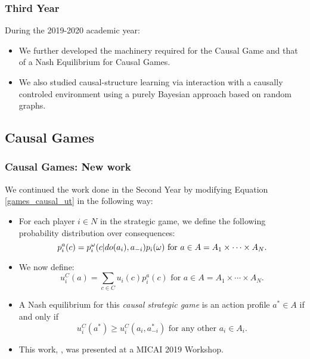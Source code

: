 \documentclass{beamer}
\theoremstyle{plain}
\begin{document}
\begin{frame}
\frametitle{Third Year}
During the 2019-2020 academic year:
\begin{itemize}
\item We further developed the machinery required for the Causal Game and that of a Nash Equilibrium for Causal Games.
\item We also studied causal-structure learning via interaction with a causally controled environment using a purely Bayesian approach based on random graphs.
\end{itemize}
\end{frame}

\subsection{Causal Games}
\begin{frame}
\frametitle{Causal Games: New work}
We continued the work done in the Second Year by modifying Equation \ref{games_causal_ut} in the following way:
\begin{itemize}
\item For each player $i \in N$ in the strategic game, we define the following probability distribution over consequences:
\begin{equation}{\label{causal_utility}}
p^a_i (c) =  p^\omega_i (c | do(a_i), a_{-i}) p_i(\omega)\textrm{ for } a \in A=A_1 \times \cdots \times A_N.
\end{equation}
\item We now define:
\begin{equation}
u^C_i (a) = \sum_{c \in C}  u_i(c) p^a_i (c) \textrm{ for } a \in A=A_1 \times \cdots \times A_N.
\end{equation}
\item A Nash equilibrium for this \textit{causal strategic game} is an action profile $a^\ast \in A$ if and only if
\begin{equation}
 u^C_i(a^\ast) \geq u^C_i(a_i, a^\ast_{-i}) \textrm{ for any other } a_i \in A_i. 
 \end{equation}
\item This work, \cite{gonzalez2019games}, was presented at a MICAI 2019 Workshop.
\end{itemize}
\end{frame}
\end{document}
